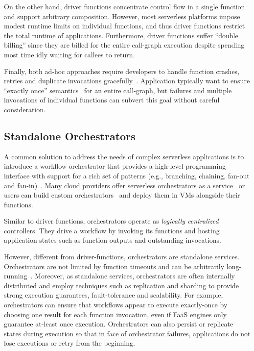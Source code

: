 On the other hand, driver functions concentrate control flow in a single
function and support arbitrary composition. However, most serverless platforms
impose modest runtime limits on individual functions, and thus driver
functions restrict the total runtime of applications. Furthermore, driver
functions suffer ``double billing'' since they are billed for the entire
call-graph execution despite spending most time idly waiting for callees to
return.

Finally, both ad-hoc approaches require developers to handle function crashes,
retries and duplicate invocations gracefully~\cite{aws-lambda-retry,
azure-functions-retry, aws-lambda-async-invoke,
azure-functions-exec-guarantee}. Application typically want to ensure
``exactly once'' semantics~\cite{netherite, beldi, boki,
formal-foundation-exec-gtnee, durable-semantics} for an entire call-graph, but
failures and multiple invocations of individual functions can subvert this
goal without careful consideration.

\subsection{Standalone Orchestrators}\label{sec:bg:orchestrator}

A common solution to address the needs of complex serverless
applications is to introduce a workflow orchestrator that provides a
high-level programming interface with support for a rich set of patterns
(e.g., branching, chaining, fan-out and fan-in)~\cite{excamera, gg-atc,
aws-step-functions, google-cloud-composer, google-workflows,
durable-functions,temporal}. Many cloud providers offer serverless
orchestrators as a service~\cite{aws-step-functions, google-cloud-composer,
google-workflows, durable-functions} or users can build custom
orchestrators~\cite{temporal, gg-atc, excamera} and deploy them in VMs
alongside their functions.

Similar to driver functions, orchestrators operate as \emph{logically
centralized} controllers. They drive a workflow by invoking its functions and
hosting application states such as function outputs and outstanding
invocations.

However, different from driver-functions, orchestrators are standalone
services. Orchestrators are not limited by function timeouts and can be
arbitrarily long-running~\cite{aws-step-functions-quotas}. Moreover, as
standalone services, orchestrators are often internally distributed and employ
techniques such as replication and sharding to provide strong execution
guarantees, fault-tolerance and scalability. For example, orchestrators can
ensure that workflows appear to execute exactly-once by choosing one result
for each function invocation, even if FaaS engines only guarantee at-least
once execution. Orchestrators can also persist or replicate states during
execution so that in face of orchestrator failures, applications do not lose
executions or retry from the beginning.

